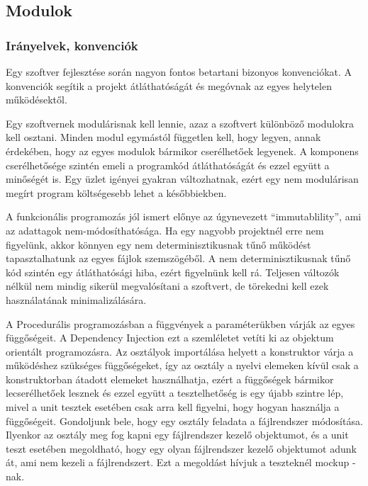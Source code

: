 \documentclass[a4paper,12pt,oneside]{report}
\begin{document}
\newpage
\subsection{Modulok}
\subsubsection{Irányelvek, konvenciók}

\begin{justify}

	Egy szoftver fejlesztése során nagyon fontos betartani bizonyos konvenciókat. A konvenciók segítik a projekt átláthatóságát és megóvnak az egyes helytelen működésektől. \cite{website:coding_standards_matter} 

	Egy szoftvernek modulárisnak kell lennie, azaz a szoftvert különböző modulokra kell osztani. Minden modul egymástól független kell, hogy legyen, annak érdekében, hogy az egyes modulok bármikor cserélhetőek legyenek. A komponens cserélhetősége szintén emeli a programkód átláthatóságát és ezzel együtt a minőségét is. Egy üzlet igényei gyakran változhatnak, ezért egy nem modulárisan megírt program költségesebb lehet a későbbiekben. \cite{book:replace_component}

	A funkcionális programozás jól ismert előnye az úgynevezett “immutablility”, ami az adattagok nem-módosíthatósága. Ha egy nagyobb projektnél erre nem figyelünk, akkor könnyen egy nem determinisztikusnak tűnő működést tapasztalhatunk az egyes fájlok szemszögéből. A nem determinisztikusnak tűnő kód szintén egy átláthatósági hiba, ezért figyelnünk kell rá. Teljesen változók nélkül nem mindig sikerül megvalósítani a szoftvert, de törekedni kell ezek használatának minimalizálására. 

	A Procedurális programozásban a függvények a paraméterükben várják az egyes függőségeit. A Dependency Injection ezt a szemléletet vetíti ki az objektum orientált programozásra. Az osztályok importálása helyett a konstruktor várja a működéshez szükséges függőségeket, így az osztály a nyelvi elemeken kívül csak a konstruktorban átadott elemeket használhatja, ezért a függőségek bármikor lecserélhetőek lesznek és ezzel együtt a tesztelhetőség is egy újabb szintre lép, mivel a unit tesztek esetében csak arra kell figyelni, hogy hogyan használja a függőségeit. Gondoljunk bele, hogy egy osztály feladata a fájlrendszer módosítása. \cite{website:dependency_injection, website:dependency_injection_procedural} Ilyenkor az osztály meg fog kapni egy fájlrendszer kezelő objektumot, és a unit teszt esetében megoldható, hogy egy olyan fájlrendszer kezelő objektumot adunk át, ami nem kezeli a fájlrendszert. Ezt a megoldást hívjuk a teszteknél mockup -nak. 


\end{justify}
\end{document}
